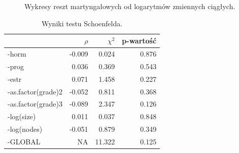 \documentclass[]{article}
\begin{document}
\begin{figure}[hbt!]
  \vspace{-10pt}
  \begin{center}
  \end{center}
  \vspace{-20pt}
  \label{fig:sc}
  \caption{Wykresy reszt martyngałowych od logarytmów zmiennych ciągłych.}

\end{figure}

\begin{table}
\vspace{-12pt}
\caption{ Wyniki testu Schoenfelda. }
\begin{tabular}{lrrr}
\toprule%
  & $\rho$ & $\chi^2$ & p-wartość\\ \toprule 

-horm & -0.009 & 0.024 & 0.876\\  
         
-prog & 0.036 & 0.369 & 0.543\\     
         
-estr & 0.071 & 1.458 & 0.227\\     
         
-as.factor(grade)2 & -0.052 & 0.811 & 0.368\\       
         
-as.factor(grade)3 & -0.089 & 2.347 & 0.126\\   
         
-log(size) & 0.011 & 0.037 & 0.848\\        
         
-log(nodes) & -0.051 & 0.879 & 0.349\\      

-GLOBAL & NA & 11.322 & 0.125\\  \bottomrule
\end{tabular}
\vspace{-7.5pt}
\end{table}
\end{document}
